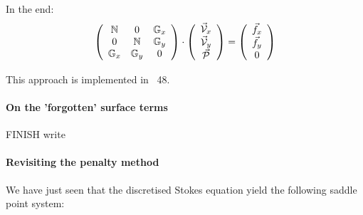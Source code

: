 In the end:
\[
\left(
\begin{array}{ccc}
{{\mathbb{N}}} & 0 & {{\mathbb{G}}}_x  \\
0 & {{\mathbb{N}}} & {{\mathbb{G}}}_y  \\
{\mathbb{G}}_x & {\mathbb{G}}_y & 0 
\end{array}
\right)
\cdot
\left(
\begin{array}{c}
\vec{\cal V}_x \\
\vec{\cal V}_y \\
\vec{\cal P} 
\end{array}
\right)
=
\left(
\begin{array}{c}
\vec{f}_x \\
\vec{f}_y \\
0
\end{array}
\right)
\]

This approach is implemented in \stone~48. 






\paragraph{On the 'forgotten' surface terms}

FINISH write

\paragraph{Revisiting the penalty method}

We have just seen that the discretised Stokes equation yield the 
following saddle point system:


